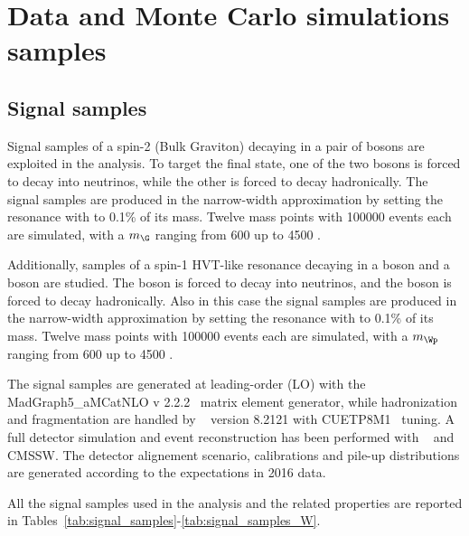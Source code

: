\section{Data and Monte Carlo simulations samples}
\label{sec:samples}

\subsection{Signal samples}

Signal samples of a spin-2 (Bulk Graviton) decaying in a pair of \Z bosons are exploited in the analysis. To target the final state, one of the two \Z bosons is forced to decay into neutrinos, while the other \Z is forced to decay hadronically. The signal samples are produced in the narrow-width approximation by setting the resonance with to 0.1\% of its mass. Twelve mass points with 100000 events each are simulated, with a $m_{\G}$ ranging from 600 \GeV up to 4500 \GeV.

\noindent Additionally, samples of a spin-1 HVT-like \Wp resonance decaying in a \Z boson and a \W boson are studied. The \Z boson is forced to decay into neutrinos, and the \W boson is forced to decay hadronically. Also in this case the signal samples are produced in the narrow-width approximation by setting the resonance with to 0.1\% of its mass. Twelve mass points with 100000 events each are simulated, with a $m_{\Wp}$ ranging from 600 \GeV up to 4500 \GeV.

\noindent The signal samples are generated at leading-order (LO) with the {\sc MadGraph5\_aMCatNLO v 2.2.2}~\cite{bib:MADGRAPH} matrix element generator, while hadronization and fragmentation are handled by ~\cite{bib:PYTHIA} version 8.2121 with CUETP8M1~\cite{bib:CUETP8M1} tuning. A full detector simulation and event reconstruction has been performed with \GEANTfour~\cite{bib:GEANT4} and CMSSW. The detector alignement scenario, calibrations and pile-up distributions are generated according to the expectations in 2016 data.

\noindent All the signal samples used in the analysis and the related properties are reported in Tables~\ref{tab:signal_samples}-\ref{tab:signal_samples_W}.
 
